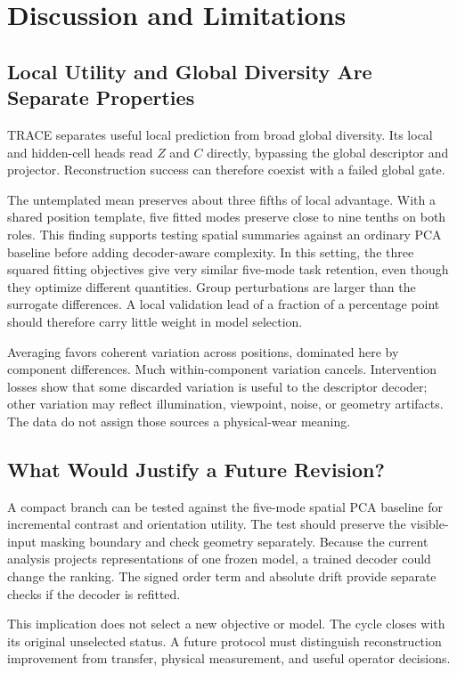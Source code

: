 \section{Discussion and Limitations}\label{sec:discussion}
\subsection{Local Utility and Global Diversity Are Separate Properties}
TRACE separates useful local prediction from broad global diversity. Its local and hidden-cell heads read $Z$ and $C$ directly, bypassing the global descriptor and projector. Reconstruction success can therefore coexist with a failed global gate.

The untemplated mean preserves about three fifths of local advantage. With a shared position template, five fitted modes preserve close to nine tenths on both roles. This finding supports testing spatial summaries against an ordinary PCA baseline before adding decoder-aware complexity. In this setting, the three squared fitting objectives give very similar five-mode task retention, even though they optimize different quantities. Group perturbations are larger than the surrogate differences. A local validation lead of a fraction of a percentage point should therefore carry little weight in model selection.

Averaging favors coherent variation across positions, dominated here by component differences. Much within-component variation cancels. Intervention losses show that some discarded variation is useful to the descriptor decoder; other variation may reflect illumination, viewpoint, noise, or geometry artifacts. The data do not assign those sources a physical-wear meaning.

\subsection{What Would Justify a Future Revision?}
A compact branch can be tested against the five-mode spatial PCA baseline for incremental contrast and orientation utility. The test should preserve the visible-input masking boundary and check geometry separately. Because the current analysis projects representations of one frozen model, a trained decoder could change the ranking. The signed order term and absolute drift provide separate checks if the decoder is refitted.

This implication does not select a new objective or model. The cycle closes with its original unselected status. A future protocol must distinguish reconstruction improvement from transfer, physical measurement, and useful operator decisions.

